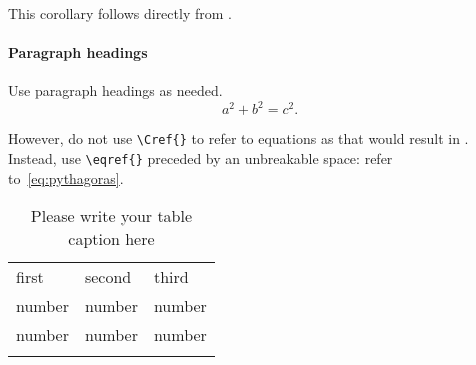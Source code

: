\documentclass[smallextended]{svjour3}       %
\begin{document}
\begin{corollary}
  This corollary follows directly from .
\end{corollary}

\paragraph{Paragraph headings}

Use paragraph headings as needed.
\begin{equation}%
  \label{eq:pythagoras}
  a^2+b^2=c^2.
\end{equation}

However, do not use \verb|\Cref{}| to refer to equations as that would result in .
Instead, use \verb|\eqref{}| preceded by an unbreakable space: refer to~\eqref{eq:pythagoras}.

%
\begin{table}
  \caption{Please write your table caption here}
  \label{tab:1}       %
  \begin{tabular}{lll}
    \hline\noalign{\smallskip}
    first & second & third  \\
    \noalign{\smallskip}\hline\noalign{\smallskip}
    number & number & number \\
    number & number & number \\
    \noalign{\smallskip}\hline
  \end{tabular}
\end{table}

\end{document}
